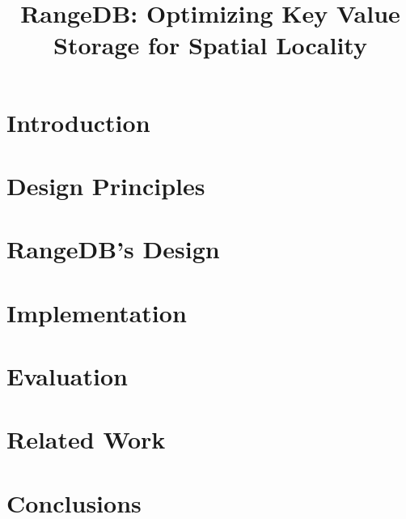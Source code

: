 \documentclass[sigplan,10pt]{acmart}
\date{}
\newcommand{\sys}{RangeDB}
\begin{document}
\title{\sys: Optimizing Key Value Storage for Spatial Locality} 
\author{}

\begin{abstract}

\end{abstract}

\maketitle

\section{Introduction}


\section{Design Principles}
\label{sec:principles}

\section{\sys's Design}
\label{sec:design}


\section{Implementation}
\label{sec:impl}


\section{Evaluation}
\label{sec:eval}


\section{Related Work}
\label{sec:related}


\section{Conclusions}
\label{sec:conclusions}


%

\clearpage


\end{document}

